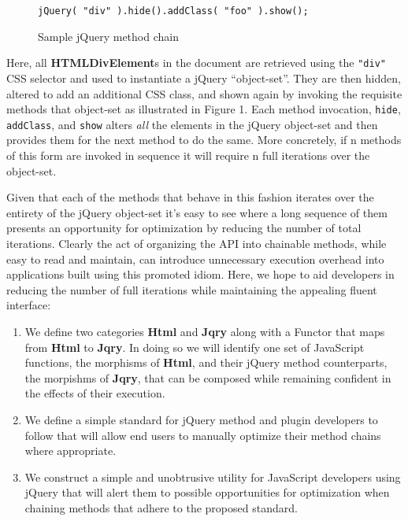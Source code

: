\documentclass[preprint]{sigplanconf}
\begin{document}
\begin{figure}[h!]
\begin{verbatim}
jQuery( "div" ).hide().addClass( "foo" ).show();
\end{verbatim}
\caption{Sample jQuery method chain}
\end{figure}

Here, all \textbf{HTMLDivElement}s in the document are retrieved using the \verb|"div"| CSS selector and used to instantiate a jQuery ``object-set''. They are then hidden, altered to add an additional CSS class, and shown again by invoking the requisite methods that object-set as illustrated in Figure 1. Each method invocation, \verb|hide|, \verb|addClass|, and \verb|show| alters \textit{all} the elements in the jQuery object-set and then provides them for the next method to do the same. More concretely, if n methods of this form are invoked in sequence it will require n full iterations over the object-set.

Given that each of the methods that behave in this fashion iterates over the entirety of the jQuery object-set it's easy to see where a long sequence of them presents an opportunity for optimization by reducing the number of total iterations. Clearly the act of organizing the API into chainable methods, while easy to read and maintain, can introduce unnecessary execution overhead into applications built using this promoted idiom. Here, we hope to aid developers in reducing the number of full iterations while maintaining the appealing fluent interface:

\begin{enumerate}
\item We define two categories \textbf{Html} and \textbf{Jqry} along with a Functor that maps from \textbf{Html} to \textbf{Jqry}. In doing so we will identify one set of JavaScript functions, the morphisms of \textbf{Html}, and their jQuery method counterparts, the morpishms of \textbf{Jqry}, that can be composed while remaining confident in the effects of their execution.
\item We define a simple standard for jQuery method and plugin developers to follow that will allow end users to manually optimize their method chains where appropriate.
\item We construct a simple and unobtrusive utility for JavaScript developers using jQuery that will alert them to possible opportunities for optimization when chaining methods that adhere to the proposed standard.
\end{enumerate}
\end{document}
